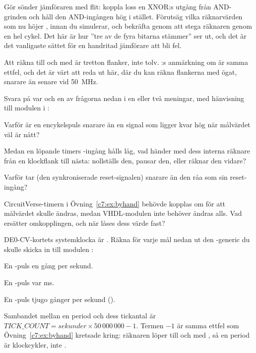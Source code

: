  Gör sönder jämföraren med flit: koppla loss en XNOR:s utgång från AND-grinden och håll den
AND-ingången hög i stället. Förutsäg vilka räknarvärden som nu höjer , innan du
simulerar, och bekräfta genom att stega räknaren genom en hel cykel. Det här är hur ”tre av de fyra
bitarna stämmer” ser ut, och det är det vanligaste sättet för en handritad jämförare att bli fel.

\note[Tips]Att räkna  till och med  är tretton flanker, inte tolv.
:s anmärkning om  är samma ettfel, och det är värt att
reda ut här, där du kan räkna flankerna med ögat, snarare än senare vid 50~MHz.

\label{c7:ex:questions}
Svara på var och en av frågorna nedan i en eller två meningar, med hänvisning till modulen
 i :

 Varför är  en encykelspuls snarare än en signal som ligger kvar hög när
målvärdet väl är nått?

 Medan en löpande timers -ingång hålls låg, vad händer med dess interna
räknare från en klockflank till nästa: nollställs den, pausar den, eller räknar den vidare?

 Varför tar   (den synkroniserade reset-signalen) snarare än
den råa  som sin reset-ingång?

 CircuitVerse-timern i Övning~\ref{c7:ex:byhand} behövde kopplas om för att målvärdet
skulle ändras, medan VHDL-modulen inte behöver ändras alls. Vad ersätter omkopplingen, och när låses
dess värde fast?


\label{c7:ex:ticks}
DE0-CV-kortets systemklocka är . Räkna för varje mål nedan ut den
-generic du skulle skicka in till modulen :

 En -puls en gång per sekund.

 En -puls var  ms.

 En -puls tjugo gånger per sekund ().

\note[Tips]Sambandet mellan en period och dess tickantal är
$\mathit{TICK\_COUNT} = \mathit{sekunder} \times 50\,000\,000 - 1$. Termen $-1$ är samma ettfel som
Övning~\ref{c7:ex:byhand} kretsade kring: räknaren löper  till och med , så
en period är  klockcykler, inte .

